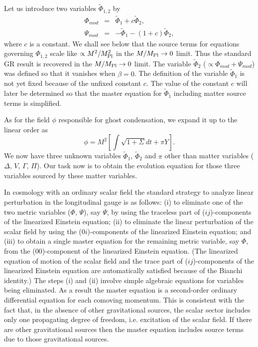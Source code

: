 Let us introduce two variables $\tilde{\Phi}_{1,2}$ by 
%
\begin{eqnarray}
 \Phi_{mod} & = & \tilde{\Phi}_1 + c\tilde{\Phi}_2, \nonumber\\
 \Psi_{mod} & = & - \tilde{\Phi}_1 - (1+c)\tilde{\Phi}_2,
  \label{eqn:def-Phi1-Phi2}
\end{eqnarray}
where $c$ is a constant. We shall see below that the source terms for
equations governing $\Phi_{1,2}$ scale like $\propto M^2/M_{\rm Pl}^2$
in the $M/M_{\rm Pl}\to 0$ limit. Thus the standard GR result is
recovered in the $M/M_{\rm Pl}\to 0$ limit. The variable
$\tilde{\Phi}_2$ ($\propto\Phi_{mod}+\Psi_{mod}$) was defined so that it
vanishes when $\beta=0$. The definition of the variable $\tilde{\Phi}_1$
is not yet fixed because of the unfixed constant $c$. The value of the
constant $c$ will later be determined so that the master equation for 
$\tilde{\Phi}_1$ including matter source terms is simplified. 


As for the field $\phi$ responsible for ghost condensation, we expand it
up to the linear order as 
%
\begin{equation}
 \phi = M^2 \left[\int \sqrt{1+\Sigma}dt + \pi Y\right].
\end{equation}
We now have three unknown variables $\tilde{\Phi}_1$, $\tilde{\Phi}_2$
and $\pi$ other than matter variables ($\Delta$, $V$, $\Gamma$,
$\Pi$). Our task now is to obtain the evolution equation for those three
variables sourced by these matter variables. 


In cosmology with an ordinary scalar field the standard strategy to
analyze linear perturbation in the longitudinal gauge is as follows: (i)
to eliminate one of the two metric variables ($\Phi$, $\Psi$), say
$\Psi$, by using the traceless part of ($ij$)-components of the
linearized Einstein equation; (ii) to eliminate the linear perturbation
of the scalar field by using the ($0i$)-components of the linearized
Einstein equation; and (iii) to obtain a single master equation for the
remaining metric variable, say $\Phi$, from the ($00$)-component of the
linearized Einstein equation. (The linearized equation of motion of the
scalar field and the trace part of ($ij$)-components of the linearized
Einstein equation are automatically satisfied because of the Bianchi
identity.) The steps (i) and (ii) involve simple algebraic equations
for variables being eliminated. As a result the master equation is a
second-order ordinary differential equation for each comoving
momentum. This is consistent with the fact that, in the absence of other
gravitational sources, the scalar sector includes only one propagating
degree of freedom, i.e. excitation of the scalar field. If there are
other gravitational sources then the master equation includes source
terms due to those gravitational sources. 


